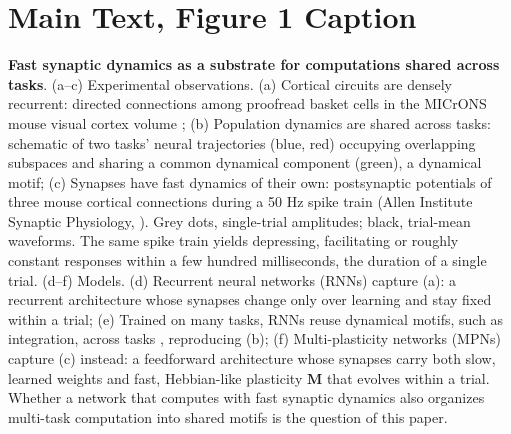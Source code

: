 \documentclass{article}
\begin{document}
\section{Main Text, Figure 1 Caption}
\textbf{Fast synaptic dynamics as a substrate for computations shared across tasks}.
(a–c) Experimental observations.
(a) Cortical circuits are densely recurrent: directed connections among proofread basket cells in the MICrONS mouse visual cortex volume \cite{microns2025functional};
(b) Population dynamics are shared across tasks: schematic of two tasks' neural trajectories (blue, red) occupying overlapping subspaces and sharing a common dynamical component (green), a dynamical motif;
(c) Synapses have fast dynamics of their own: postsynaptic potentials of three mouse cortical connections during a 50 Hz spike train (Allen Institute Synaptic Physiology, \cite{campagnola2022local}). Grey dots, single-trial amplitudes; black, trial-mean waveforms. The same spike train yields depressing, facilitating or roughly constant responses within a few hundred milliseconds, the duration of a single trial.
(d–f) Models.
(d) Recurrent neural networks (RNNs) capture (a): a recurrent architecture whose synapses change only over learning and stay fixed within a trial;
(e) Trained on many tasks, RNNs reuse dynamical motifs, such as integration, across tasks \cite{yang2019task, driscoll2024flexible}, reproducing (b);
(f) Multi-plasticity networks (MPNs) capture (c) instead: a feedforward architecture whose synapses carry both slow, learned weights and fast, Hebbian-like plasticity $\mathbf{M}$ that evolves within a trial. Whether a network that computes with fast synaptic dynamics also organizes multi-task computation into shared motifs is the question of this paper.
\end{document}
